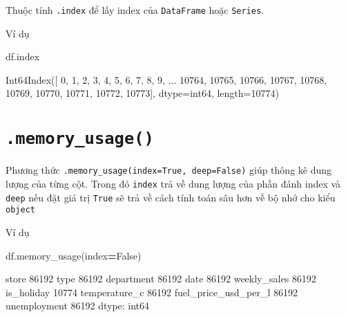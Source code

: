 \documentclass[
]{book}
\newenvironment{Shaded}{\begin{snugshade}}{\end{snugshade}}
\newcommand{\NormalTok}[1]{#1}
\newcommand{\OperatorTok}[1]{\textcolor[rgb]{0.81,0.36,0.00}{\textbf{#1}}}
\newcommand{\VariableTok}[1]{\textcolor[rgb]{0.00,0.00,0.00}{#1}}
\begin{document}
Thuộc tính \texttt{.index} để lấy index của \texttt{DataFrame} hoặc \texttt{Series}.

Ví dụ

\begin{Shaded}
\begin{Highlighting}[]
\NormalTok{df.index}
\end{Highlighting}
\end{Shaded}

\begin{Shaded}
\begin{Highlighting}[]
\NormalTok{Int64Index([    0,     1,     2,     3,     4,     5,     6,     7,     8,}
\NormalTok{                9,}
\NormalTok{            ...}
\NormalTok{            10764, 10765, 10766, 10767, 10768, 10769, 10770, 10771, 10772,}
\NormalTok{            10773],}
\NormalTok{           dtype=\textquotesingle{}int64\textquotesingle{}, length=10774)}
\end{Highlighting}
\end{Shaded}

\section{\texorpdfstring{\texttt{.memory\_usage()}}{.memory\_usage()}}\label{memory_usage}

Phương thức \texttt{.memory\_usage(index=True,\ deep=False)} giúp thông kê dung lượng của từng cột. Trong đó \texttt{index} trả về dung lượng của phần đánh index và \texttt{deep} nếu đặt giá trị \texttt{True} sẽ trả về cách tính toán sâu hơn về bộ nhớ cho kiểu \texttt{object}

Ví dụ

\begin{Shaded}
\begin{Highlighting}[]
\NormalTok{df.memory\_usage(index}\OperatorTok{=}\VariableTok{False}\NormalTok{)}
\end{Highlighting}
\end{Shaded}

\begin{Shaded}
\begin{Highlighting}[]
\NormalTok{store                   86192}
\NormalTok{type                    86192}
\NormalTok{department              86192}
\NormalTok{date                    86192}
\NormalTok{weekly\_sales            86192}
\NormalTok{is\_holiday              10774}
\NormalTok{temperature\_c           86192}
\NormalTok{fuel\_price\_usd\_per\_l    86192}
\NormalTok{unemployment            86192}
\NormalTok{dtype: int64}
\end{Highlighting}
\end{Shaded}
\end{document}
